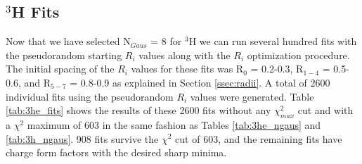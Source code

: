 \subsection{$^3$H Fits}
\label{ssec:3h_fits}

Now that we have selected N$_{Gaus}$ = 8 for $^3$H we can run several hundred fits with the pseudorandom starting $R_i$ values along with the $R_i$ optimization procedure. The initial spacing of the $R_i$ values for these fits was R$_0$ = 0.2-0.3, R$_{1-4}$ = 0.5-0.6, and R$_{5-7}$ = 0.8-0.9 as explained in Section \ref{ssec:radii}. A total of 2600 individual fits using the pseudorandom $R_i$ values were generated. Table \ref{tab:3he_fits} shows the results of these 2600 fits without any $\chi^2_{max}$ cut and with a $\chi^2$ maximum of 603 in the same fashion as Tables \ref{tab:3he_ngaus} and \ref{tab:3h_ngaus}. 908 fits survive the $\chi^2$ cut of 603, and the remaining fits have charge form factors with the desired sharp minima.


